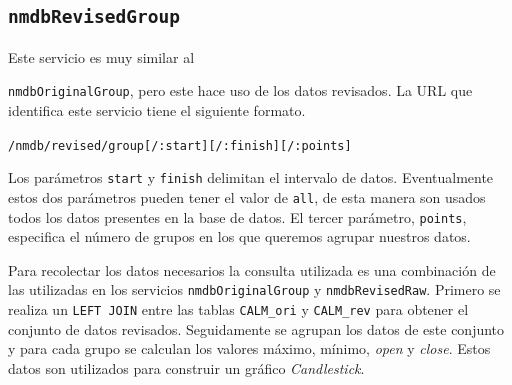 	\subsection{\texttt{nmdbRevisedGroup}}
		Este servicio es muy similar al {\texttt{nmdbOriginalGroup}, pero este hace uso de los datos revisados. La URL que identifica este
		servicio tiene el siguiente formato.
			\begin{center} \texttt{/nmdb/revised/group[/:start][/:finish][/:points]}  \end{center}
		Los parámetros \texttt{start} y \texttt{finish} delimitan el intervalo de datos. Eventualmente estos dos parámetros pueden tener el
		valor de \texttt{all}, de esta manera son usados todos los datos presentes en la base de datos. El tercer parámetro, \texttt{points},
		especifica el número de grupos en los que queremos agrupar nuestros datos.
		\par
		Para recolectar los datos necesarios la consulta utilizada es una combinación de las utilizadas en los servicios
		\texttt{nmdbOriginalGroup} y \texttt{nmdbRevisedRaw}. Primero se realiza un \texttt{LEFT JOIN} entre las tablas \texttt{CALM\_ori} y
		\texttt{CALM\_rev} para obtener el conjunto de datos revisados. Seguidamente se agrupan los datos de este conjunto y para cada grupo
		se calculan los valores máximo, mínimo, \emph{open} y \emph{close}. Estos datos son utilizados para construir un gráfico
		\emph{Candlestick}.
}
